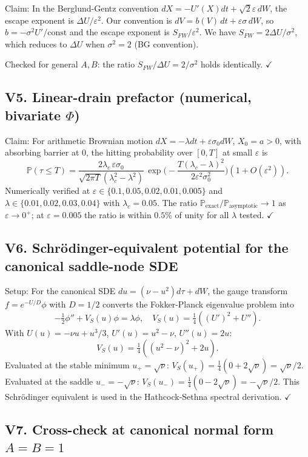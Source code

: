 \documentclass[11pt,a4paper]{article}
\theoremstyle{plain}
\theoremstyle{definition}
\renewcommand{\P}{\mathbb{P}}
\newcommand{\eps}{\varepsilon}
\begin{document}
Claim: In the Berglund-Gentz convention $dX = -U'(X)dt + \sqrt{2}\eps\,dW$, the escape exponent is $\Delta U/\eps^2$. Our convention is $dV = b(V)\,dt + \eps\sigma\,dW$, so $b = -\sigma^2 U'/\text{const}$ and the escape exponent is $S_{FW}/\eps^2$. We have $S_{FW} = 2\Delta U/\sigma^2$, which reduces to $\Delta U$ when $\sigma^2 = 2$ (BG convention).

Checked for general $A, B$: the ratio $S_{FW}/\Delta U = 2/\sigma^2$ holds identically. $\checkmark$

\subsection*{V5. Linear-drain prefactor (numerical, bivariate $\Phi$)}

Claim: For arithmetic Brownian motion $dX = -\lambda dt + \eps\sigma_0 dW$, $X_0 = a > 0$, with absorbing barrier at $0$, the hitting probability over $[0, T]$ at small $\eps$ is
$$\P(\tau \leq T) = \frac{2\lambda_c\,\eps\sigma_0}{\sqrt{2\pi T}(\lambda_c^2 - \lambda^2)}\,\exp\!\Big(-\frac{T(\lambda_c-\lambda)^2}{2\eps^2\sigma_0^2}\Big)(1 + O(\eps^2)).$$
Numerically verified at $\eps \in \{0.1, 0.05, 0.02, 0.01, 0.005\}$ and $\lambda \in \{0.01, 0.02, 0.03, 0.04\}$ with $\lambda_c = 0.05$. The ratio $\P_{\text{exact}}/\P_{\text{asymptotic}} \to 1$ as $\eps \to 0^+$; at $\eps = 0.005$ the ratio is within $0.5\%$ of unity for all $\lambda$ tested. $\checkmark$

\subsection*{V6. Schr\"odinger-equivalent potential for the canonical saddle-node SDE}

Setup: For the canonical SDE $du = (\nu - u^2)d\tau + dW$, the gauge transform $f = e^{-U/D}\phi$ with $D = 1/2$ converts the Fokker-Planck eigenvalue problem into
$$-\tfrac{1}{2}\phi'' + V_S(u)\phi = \lambda\phi,\quad V_S(u) = \tfrac{1}{4}((U')^2 + U'').$$
With $U(u) = -\nu u + u^3/3$, $U'(u) = u^2 - \nu$, $U''(u) = 2u$:
$$V_S(u) = \tfrac{1}{4}((u^2 - \nu)^2 + 2u).$$
Evaluated at the stable minimum $u_+ = \sqrt\nu$: $V_S(u_+) = \tfrac{1}{4}(0 + 2\sqrt\nu) = \sqrt\nu/2$.
Evaluated at the saddle $u_- = -\sqrt\nu$: $V_S(u_-) = \tfrac{1}{4}(0 - 2\sqrt\nu) = -\sqrt\nu/2$.
This Schr\"odinger equivalent is used in the Hathcock-Sethna spectral derivation. $\checkmark$

\subsection*{V7. Cross-check at canonical normal form $A = B = 1$}
\end{document}
